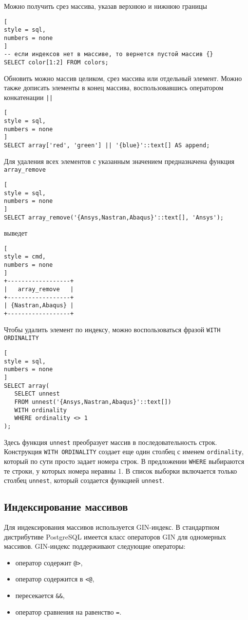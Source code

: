 \documentclass[%
	11pt,
	a4paper,
	utf8,
		]{article}
\begin{document}
Можно получить срез массива, указав верхнюю и нижнюю границы
\begin{lstlisting}[
style = sql,
numbers = none
]
-- если индексов нет в массиве, то вернется пустой массив {}
SELECT color[1:2] FROM colors;
\end{lstlisting}

Обновить можно массив целиком, срез массива или отдельный элемент. Можно также дописать элементы в конец массива, воспользовавшись оператором конкатенации \texttt{||}
\begin{lstlisting}[
style = sql,
numbers = none
]
SELECT array['red', 'green'] || '{blue}'::text[] AS append;
\end{lstlisting}

Для удаления всех элементов с указанным значением предназначена функция \texttt{array\_remove}
\begin{lstlisting}[
style = sql,
numbers = none
]
SELECT array_remove('{Ansys,Nastran,Abaqus}'::text[], 'Ansys');
\end{lstlisting}
выведет
\begin{lstlisting}[
style = cmd,
numbers = none
]
+------------------+
|   array_remove   |
+------------------+
| {Nastran,Abaqus} |
+------------------+
\end{lstlisting}

Чтобы удалить элемент по индексу, можно воспользоваться фразой \texttt{WITH ORDINALITY}
\begin{lstlisting}[
style = sql,
numbers = none
]
SELECT array(
   SELECT unnest
   FROM unnest('{Ansys,Nastran,Abaqus}'::text[])
   WITH ordinality
   WHERE ordinality <> 1
);
\end{lstlisting}

Здесь функция \texttt{unnest} преобразует массив в последовательность строк. Конструкция \texttt{WITH ORDINALITY} создает еще один столбец с именем \texttt{ordinality}, который по сути просто задает номера строк. В предложении \texttt{WHERE} выбираются те строки, у которых номера неравны 1. В список выборки включается только столбец \texttt{unnest}, который создается функцией \texttt{unnest}. 

\subsection{Индексирование массивов}

Для индексирования массивов используется GIN-индекс. В стандартном дистрибутиве PostgreSQL имеется класс операторов GIN для одномерных массивов. GIN-индекс поддерживают следующие операторы:
\begin{itemize}
	\item оператор содержит \verb|@>|,
	
	\item оператор содержится в \verb|<@|,
	
	\item пересекается \verb|&&|,
	
	\item оператор сравнения на равенство \verb|=|.
\end{itemize}
\end{document}
